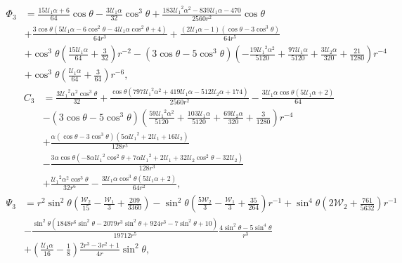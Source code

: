 \documentclass[preprint,10pt]{elsarticle}
\newcommand\cU{\mathscr{U}}
\newcommand\cW{\mathscr{W}}
\begin{document}
\begin{align*}
\varPhi_3 &= \frac{15\cU_1\alpha + 6 }{64}\cos\theta  - \frac{3 \cU_1\alpha}{32} {\cos}^3\theta
 + \frac{183 {\cU_1}^2\alpha^2 - 839 \cU_1\alpha - 470}{2560 r^2} \cos\theta 
\\ \nonumber &
+ \frac{3 \cos\theta \left(5 \cU_1\alpha - 6 {\cos^2\theta} - 4 \cU_1\alpha {\cos^2\theta} + 4\right)}{64 r^3} + \frac{\left(2 \cU_1\alpha - 1\right) \left(\cos\theta - 3 {\cos}^3\theta\right)}{64 r^5} 
\\ &+ {{\cos}^3\theta \left(\frac{15 \cU_1\alpha}{64} + \frac{3}{32}\right)}{r^{-2}} 
- \left(3 \cos\theta - 5 {\cos}^3\theta\right) \left( - \frac{19 {\cU_1}^2\alpha^2}{5120} + \frac{97 \cU_1\alpha}{5120} + \frac{3 \cU_2\alpha}{320} + \frac{21}{1280}\right){r^{-4}} 
\\ \nonumber &
+ {{\cos}^3\theta \left(\frac{\cU_1\alpha}{64} + \frac{3}{64}\right)}{r^{-6}},
\end{align*}
\begin{align*}
C_3 &=
\frac{3 {{\cU_1}}^2\alpha^2 {\cos^3\theta}}{32} + \frac{\cos\theta \left(797 {{\cU_1}}^2\alpha^2 + 419 {\cU_1}\alpha - 512 {\cU_2}\alpha + 174\right)}{2560 r^2} 
- \frac{3 {\cU_1}\alpha \cos\theta \left(5 {\cU_1}\alpha + 2\right)}{64} 
\\ \nonumber &
- {\left(3 \cos\theta - 5 {\cos^3\theta}\right) \left(\frac{59 {{\cU_1}}^2\alpha^2}{5120} + \frac{103 {\cU_1}\alpha}{5120} + \frac{69 {\cU_2}\alpha}{320} + \frac{3}{1280}\right)}{r^{-4}} 
\\ \nonumber &
+ \frac{\alpha \left(\cos\theta - 3 {\cos^3\theta}\right) \left(5\alpha {{\cU_1}}^2 + 2 {\cU_1} + 16 {\cU_2}\right)}{128 r^5} 
\\ \nonumber &
- \frac{3\alpha \cos\theta \left( - 8\alpha {{\cU_1}}^2 {\cos^2\theta} + 7\alpha {{\cU_1}}^2 + 2 {\cU_1} + 32 {\cU_2} {\cos^2\theta} - 32 {\cU_2}\right)}{128 r^3} 
\\ \nonumber &
+ \frac{{{\cU_1}}^2\alpha^2 {\cos^3\theta}}{32 r^6} - \frac{3 {\cU_1}\alpha {\cos^3\theta} \left(5 {\cU_1}\alpha + 2\right)}{64 r^2},
\end{align*}
\begin{align*}
\Psi_3 &=
r^2 {\sin^2\theta} \left(\frac{{\cW_2}}{15} - \frac{{\cW_1}}{3} + \frac{209}{3360}\right) 
 - {{\sin^2\theta} \left(\frac{5 {\cW_2}}{3} - \frac{{\cW_1}}{3} + \frac{35}{264}\right)}{r^{-1}}
 + {{\sin^4\theta} \left(2 {\cW_2} + \frac{761}{5632}\right)}{r^{-1}} 
\\ \nonumber & 
- \frac{{\sin^2\theta} \left(1848 r^6 {\sin^2\theta} - 2079 r^3 {\sin^2\theta} + 924 r^3 - 7 {\sin^2\theta} + 10\right)}{19712 r^5} 
\frac{4 {\sin^2\theta} - 5 {\sin^4\theta}}{r^3} \\ & + \left(\frac{{\cU_1}\alpha}{16} - \frac{1}{8}\right) \frac{2 r^3 - 3 r^2 + 1}{4 r} {\sin^2\theta},
\end{align*}
\end{document}
